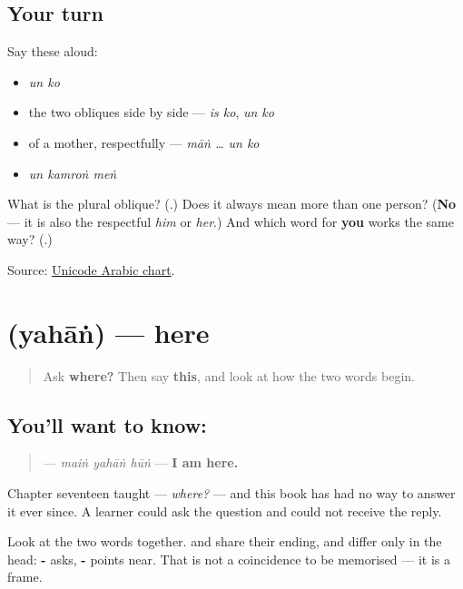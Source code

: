 \subsection*{Your turn}
Say these aloud:

\begin{itemize}
\raggedright
  \item \emph{un ko}
  \item the two obliques side by side — \emph{is ko}, \emph{un ko}
  \item of a mother, respectfully — \emph{māṅ … un ko}
  \item \emph{un kamroṅ meṅ}
\end{itemize}

\begin{tcolorbox}[breakable,colback=teal!4,colframe=teal!35!black,title={Before you move on}]
What is the plural oblique? (\textbf{}.) Does it always mean more than one person? (\textbf{No} — it is also the respectful \emph{him} or \emph{her}.) And which word for \textbf{you} works the same way? (\textbf{}.)

Source: \href{https://www.unicode.org/charts/PDF/U0600.pdf}{Unicode Arabic chart}.
\end{tcolorbox}
\section[\texorpdfstring{\ur{یہاں} (yahāṅ)}{یہاں (yahāṅ)}]{ (yahāṅ) — here}

\label{lesson:UR-C24-yahan}



\begin{quote}
Ask \textbf{where?} Then say \textbf{this}, and look at how the two words begin.
\end{quote}

\subsection*{You'll want to know: }
\begin{quote}
\textbf{  } — \emph{maiṅ yahāṅ hūṅ} — \textbf{I am here.}
\end{quote}

Chapter seventeen taught \textbf{} — \emph{where?} — and this book has had no way to answer it ever since. A learner could ask the question and could not receive the reply.

Look at the two words together. \textbf{} and \textbf{} share their ending, and differ only in the head: \textbf{-} asks, \textbf{-} points near. That is not a coincidence to be memorised — it is a frame.

